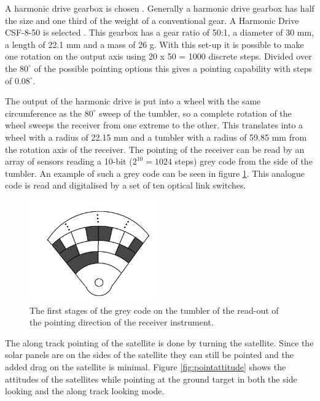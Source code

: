 A harmonic drive gearbox is chosen \cite{harmonicdrive}. Generally a harmonic drive gearbox has half the size and one third of the weight of a conventional gear. A Harmonic Drive CSF-8-50 is selected \cite{harmweb}. This gearbox has a gear ratio of 50:1, a diameter of 30 mm, a length of 22.1 mm and a mass of 26 g. With this set-up it is possible to make one rotation on the output axis using 20 x 50 = 1000 discrete steps. Divided over the $80^\circ$ of the possible pointing options this gives a pointing capability with steps of $0.08^\circ$.

The output of the harmonic drive is put into a wheel with the same circumference as the $80^\circ$ sweep of the tumbler, so a complete rotation of the wheel sweeps the receiver from one extreme to the other. This translates into a wheel with a radius of 22.15 mm and a tumbler with a radius of 59.85 mm from the rotation axis of the receiver. The pointing of the receiver can be read by an array of sensors reading a 10-bit ($2^10 = 1024$ steps) grey code from the side of the tumbler. An example of such a grey code can be seen in figure \ref{fig:greytumbler}. This analogue code is read and digitalised by a set of ten optical link switches. 

\begin{figure}
\centering
\includegraphics[width=0.5\textwidth]{chapters/img/tumbler_gray.png}
\caption[Grey code on the tumbler]{The first stages of the grey code on the tumbler of the read-out of the pointing direction of the receiver instrument.}
\label{fig:greytumbler}
\end{figure}

The along track pointing of the satellite is done by turning the satellite. Since the solar panels are on the sides of the satellite they can still be pointed and the added drag on the satellite is minimal. Figure \ref{fig:pointattitude} shows the attitudes of the satellites while pointing at the ground target in both the side looking and the along track looking mode.

